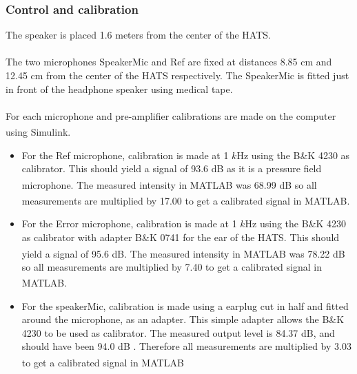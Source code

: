 \subsubsection{Control and calibration}
The speaker is placed 1.6 meters from the center of the HATS. \\\\
The two microphones SpeakerMic and Ref are fixed at distances 8.85 cm and 12.45 cm from the center of the HATS respectively. The SpeakerMic is fitted just in front of the headphone speaker using medical tape.\\\\
For each microphone and pre-amplifier calibrations are made on the computer using Simulink\textsuperscript{\textregistered}.
\begin{itemize}
	\item For the Ref microphone, calibration is made at 1 $k$Hz using the B\&K 4230 as calibrator. This should yield a signal of 93.6 dB as it is a pressure field microphone. The measured intensity in MATLAB\textsuperscript{\textregistered} was 68.99 dB so all measurements are multiplied by 17.00 to get a calibrated signal in MATLAB\textsuperscript{\textregistered}. 
	\item For the Error microphone, calibration is made at 1 $k$Hz using the B\&K 4230 as calibrator with adapter B\&K 0741 for the ear of the HATS. This should yield a signal of 95.6 dB. The measured intensity in MATLAB\textsuperscript{\textregistered} was 78.22 dB so all measurements are multiplied by 7.40 to get a calibrated signal in MATLAB\textsuperscript{\textregistered}. 
	\item For the speakerMic, calibration is made using a earplug cut in half and fitted around the microphone, as an adapter. This simple adapter allows the B\&K 4230 to be used as calibrator. The measured output level is 84.37 dB, and should have been 94.0 dB . Therefore all measurements are multiplied by 3.03 to get a calibrated signal in MATLAB\textsuperscript{\textregistered}
\end{itemize} 
 
